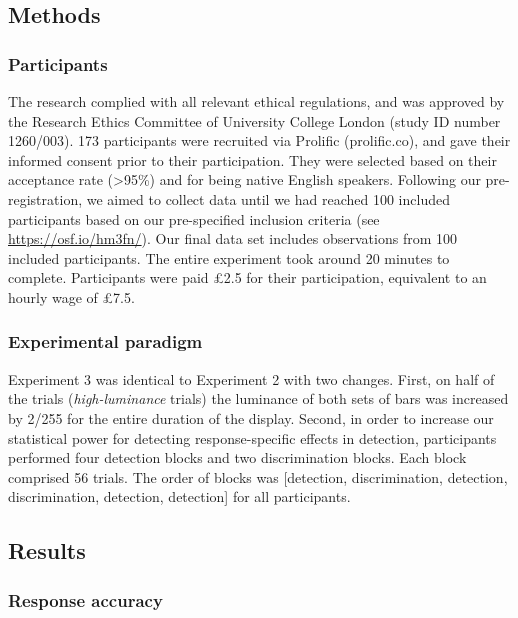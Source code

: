 \documentclass[12pt,twoside]{reedthesis}
\begin{document}
\hypertarget{methods-2}{%
\subsection{Methods}\label{methods-2}}

\hypertarget{participants-6}{%
\subsubsection{Participants}\label{participants-6}}

The research complied with all relevant ethical regulations, and was approved by the Research Ethics Committee of University College London (study ID number 1260/003). 173 participants were recruited via Prolific (prolific.co), and gave their informed consent prior to their participation. They were selected based on their acceptance rate (\textgreater95\%) and for being native English speakers. Following our pre-registration, we aimed to collect data until we had reached 100 included participants based on our pre-specified inclusion criteria (see \url{https://osf.io/hm3fn/}). Our final data set includes observations from 100 included participants. The entire experiment took around 20 minutes to complete. Participants were paid £2.5 for their participation, equivalent to an hourly wage of £7.5.

\hypertarget{experimental-paradigm-1}{%
\subsubsection{Experimental paradigm}\label{experimental-paradigm-1}}

Experiment 3 was identical to Experiment 2 with two changes. First, on half of the trials (\emph{high-luminance} trials) the luminance of both sets of bars was increased by 2/255 for the entire duration of the display. Second, in order to increase our statistical power for detecting response-specific effects in detection, participants performed four detection blocks and two discrimination blocks. Each block comprised 56 trials. The order of blocks was {[}detection, discrimination, detection, discrimination, detection, detection{]} for all participants.

\hypertarget{results-6}{%
\subsection{Results}\label{results-6}}

\hypertarget{response-accuracy-2}{%
\subsubsection{Response accuracy}\label{response-accuracy-2}}
\end{document}
